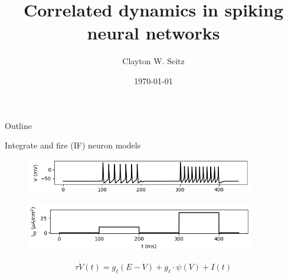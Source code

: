 \documentclass{beamer}					%
\title{Correlated dynamics in spiking neural networks}	%
\author{Clayton W. Seitz}								%
\date{\today}									%
\begin{document}
\begin{frame}
  \titlepage
\end{frame}

\begin{frame}{Outline}
  \tableofcontents
\end{frame}

%


\begin{frame}{Integrate and fire (IF) neuron models}

\begin{figure}
\centering
\includegraphics[width=100mm]{figure-19-1}
\end{figure}

\begin{figure}
\centering
\includegraphics[width=100mm]{figure-19-2}
\end{figure}

\begin{equation*}
\tau\dot{V}(t) = g_{\ell}(E - V) + g_{\ell}\cdot \psi(V) + I(t)
\end{equation*}


\end{frame}
\end{document}
